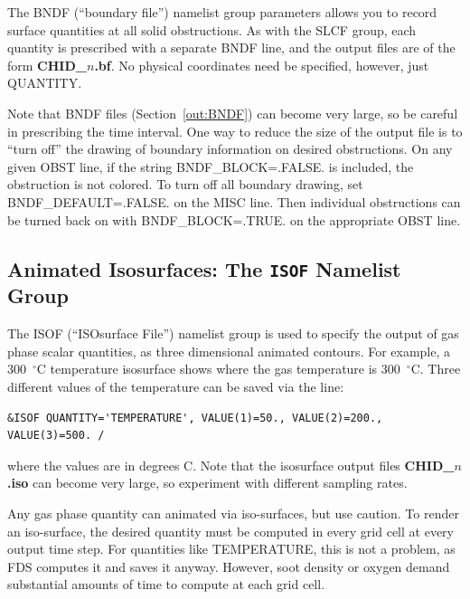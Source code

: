 \documentclass[11pt]{book}
\begin{document}
The {\ct BNDF} (``boundary file'') namelist group parameters allows you
to record surface quantities at all solid obstructions. As with
the {\ct SLCF} group, each quantity is prescribed with a separate
{\ct BNDF} line, and the output files are of the form {\bf CHID\_$n$.bf}.
No physical coordinates need be specified, however, just {\ct QUANTITY}.

Note that {\ct BNDF} files (Section~\ref{out:BNDF}) can become very
large, so be careful in prescribing the time interval.
One way to reduce the size of the output file is to ``turn off'' the
drawing of boundary information on desired obstructions. On any given
{\ct OBST} line, if the string {\ct BNDF\_BLOCK=.FALSE.} is included,
the obstruction is not colored. To turn off all boundary drawing,
set {\ct BNDF\_DEFAULT=.FALSE.} on the {\ct MISC} line. Then individual
obstructions can be turned back on with {\ct BNDF\_BLOCK=.TRUE.} on
the appropriate {\ct OBST} line.



\subsection{Animated Isosurfaces: The \texorpdfstring{{\tt ISOF}}{ISOF} Namelist Group}%

\label{info:ISOF}

The {\ct ISOF} (``ISOsurface File'') namelist group is used to specify the output of
gas phase scalar quantities, as three dimensional animated contours.
For example, a 300~$^\circ$C temperature isosurface shows where the gas temperature is
300~$^\circ$C.
Three different values of the temperature can be saved via the line:

\footnotesize
\begin{verbatim}
&ISOF QUANTITY='TEMPERATURE', VALUE(1)=50., VALUE(2)=200., VALUE(3)=500. /
\end{verbatim}
\normalsize

\noindent
where the values are in degrees C. Note that the isosurface output
files {\bf CHID\_$n$.iso} can become very large, so experiment with different sampling rates.

Any gas phase quantity can animated via iso-surfaces, but use caution. To render an iso-surface, the desired quantity must be
computed in every grid cell at every output time step. For quantities like {\ct TEMPERATURE}, this is not a problem, as FDS computes it and saves it
anyway. However, {\ct soot density} or {\ct oxygen} demand substantial amounts of time to compute at each grid cell.
\end{document}
